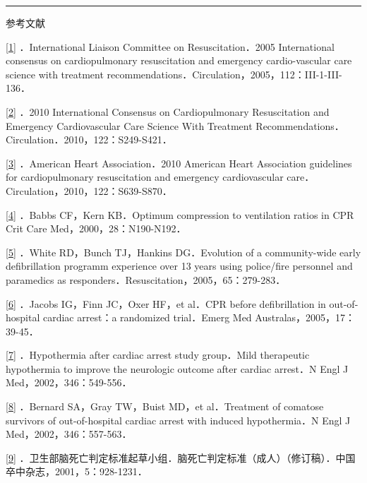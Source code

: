 \begin{center}\rule{0.5\linewidth}{\linethickness}\end{center}

参考文献

\protect\hyperlink{text00023.htmlux5cux23ch1-22-back}{{[}1{]}}
．International Liaison Committee on Resuscitation．2005 International
consensus on cardiopulmonary resuscitation and emergency cardio-vascular
care science with treatment
recommendations．Circulation，2005，112：III-1-III-136．

\protect\hyperlink{text00023.htmlux5cux23ch2-22-back}{{[}2{]}} ．2010
International Consensus on Cardiopulmonary Resuscitation and Emergency
Cardiovascular Care Science With Treatment
Recommendations．Circulation．2010，122：S249-S421．

\protect\hyperlink{text00023.htmlux5cux23ch3-22-back}{{[}3{]}}
．American Heart Association．2010 American Heart Association guidelines
for cardiopulmonary resuscitation and emergency cardiovascular
care．Circulation，2010，122：S639-S870．

\protect\hyperlink{text00023.htmlux5cux23ch4-22-back}{{[}4{]}} ．Babbs
CF，Kern KB．Optimum compression to ventilation ratios in CPR Crit Care
Med，2000，28：N190-N192．

\protect\hyperlink{text00023.htmlux5cux23ch5-22-back}{{[}5{]}} ．White
RD，Bunch TJ，Hankins DG．Evolution of a community-wide early
defibrillation programm experience over 13 years using police/fire
personnel and paramedics as
responders．Resuscitation，2005，65：279-283．

\protect\hyperlink{text00023.htmlux5cux23ch6-22-back}{{[}6{]}} ．Jacobs
IG，Finn JC，Oxer HF，et al．CPR before defibrillation in
out-of-hospital cardiac arrest：a randomized trial．Emerg Med
Australas，2005，17：39-45．

\protect\hyperlink{text00023.htmlux5cux23ch7-22-back}{{[}7{]}}
．Hypothermia after cardiac arrest study group．Mild therapeutic
hypothermia to improve the neurologic outcome after cardiac arrest．N
Engl J Med，2002，346：549-556．

\protect\hyperlink{text00023.htmlux5cux23ch8-22-back}{{[}8{]}} ．Bernard
SA，Gray TW，Buist MD，et al．Treatment of comatose survivors of
out-of-hospital cardiac arrest with induced hypothermia．N Engl J
Med，2002，346：557-563．

\protect\hyperlink{text00023.htmlux5cux23ch9-22-back}{{[}9{]}}
．卫生部脑死亡判定标准起草小组．脑死亡判定标准（成人）（修订稿）．中国卒中杂志，2001，5：928-1231．

\protect\hypertarget{text00024.html}{}{}

